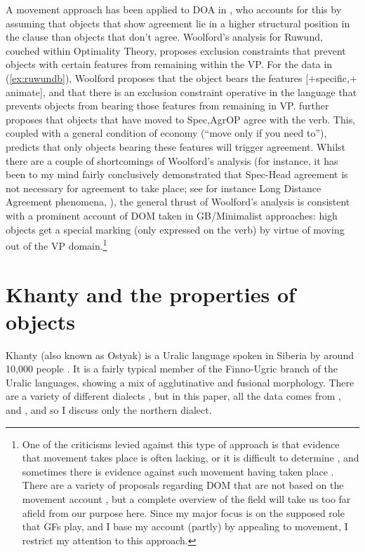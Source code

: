 \documentclass[output=paper
,modfonts
,nonflat]{langsci/langscibook}
\begin{document}
A movement approach has been applied to DOA in \citet{woolford1999,woolford2001}, who accounts for this by assuming that objects that show agreement lie in a higher structural position in the clause than objects that don't agree.
Woolford's analysis for Ruwund, couched within Optimality Theory, proposes exclusion constraints that prevent objects with certain features from remaining within the VP.
For the data in (\ref{ex:ruwundb}), Woolford proposes that the object bears the features [$+$specific,$+$animate], and that there is an exclusion constraint operative in the language that prevents objects from bearing those features from remaining in VP.
 \citeauthor{woolford2001} further proposes that objects that have moved to Spec,AgrOP agree with the verb. 
This, coupled with a general condition of economy (``move only if you need to''), predicts that only objects bearing these features will trigger agreement. 
Whilst there are a couple of shortcomings of Woolford's analysis (for instance, it has been to my mind fairly conclusively demonstrated that Spec-Head agreement is not necessary for agreement to take place; see for instance Long Distance Agreement phenomena, \citealt{polinskypotsdam2001}), the general thrust of Woolford's analysis is consistent with a prominent account of DOM taken in GB/Minimalist approaches: high objects get a special marking (only expressed on the verb) by virtue of moving out of the VP domain.\footnote{One of the criticisms levied against this type of approach is that evidence that movement takes place is often lacking, or it is difficult to determine \citep{dn2011,Baker2015}, and sometimes there is evidence against such movement having taken place \citep{kalinweisser2017}. 
There are a variety of proposals regarding DOM that are not based on the movement account \citep{bossong1991,aissen2003,deswart2007,keinemuller2014,kalin2017}, but a complete overview of the field will take us too far afield from our purpose here. Since my major focus is on the supposed role that GFs play, and I base my account (partly) by appealing to movement, I restrict my attention to this approach.}





\section{Khanty and the properties of objects}\label{Khanty}


Khanty (also known as Ostyak) is a Uralic language spoken in Siberia by around 10,000 people \citep{ethnologue}.
It is a fairly typical member of the Finno-Ugric branch of the Uralic languages, showing a mix of agglutinative and fusional morphology.
There are a variety of different dialects \citep{ostyakgrammar}, but in this paper, all the data comes from \citet{nikolaeva1999}, \citet{nikolaeva2001} and \citet{dn2011}, and so I discuss only the northern dialect.
\end{document}
